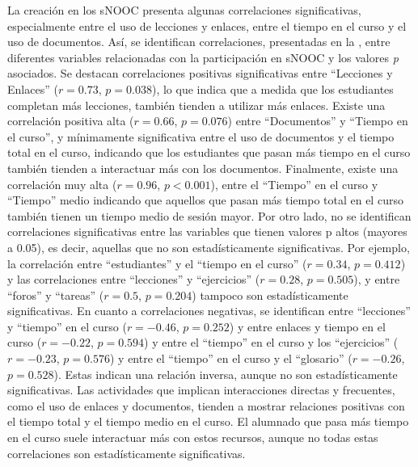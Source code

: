La creación en los sNOOC presenta algunas correlaciones significativas,
especialmente entre el uso de lecciones y enlaces, entre el tiempo en el
curso y el uso de documentos. Así, se identifican correlaciones,
presentadas en la , entre diferentes variables relacionadas con
la participación en sNOOC y los valores \emph{p} asociados. Se destacan
correlaciones positivas significativas entre ``Lecciones y Enlaces'' ($r
= 0.73$, $p = 0.038$), lo que indica que a medida que los estudiantes
completan más lecciones, también tienden a utilizar más enlaces. Existe
una correlación positiva alta ($r = 0.66$, $p = 0.076$) entre ``Documentos''
y ``Tiempo en el curso'', y mínimamente significativa entre el uso de
documentos y el tiempo total en el curso, indicando que los estudiantes
que pasan más tiempo en el curso también tienden a interactuar más con
los documentos. Finalmente, existe una correlación muy alta ($r = 0.96$, $p
< 0.001$), entre el ``Tiempo'' en el curso y ``Tiempo'' medio
indicando que aquellos que pasan más tiempo total en el curso también
tienen un tiempo medio de sesión mayor. Por otro lado, no se identifican
correlaciones significativas entre las variables que tienen valores p
altos (mayores a 0.05), es decir, aquellas que no son estadísticamente
significativas. Por ejemplo, la correlación entre ``estudiantes'' y el
``tiempo en el curso'' ($r = 0.34$, $p = 0.412$) y las correlaciones entre
``lecciones'' y ``ejercicios'' ($r = 0.28$, $p = 0.505$), y entre ``foros''
y ``tareas'' ($r = 0.5$, $p = 0.204$) tampoco son estadísticamente
significativas. En cuanto a correlaciones negativas, se identifican
entre ``lecciones'' y ``tiempo'' en el curso ($r = -0.46$, $p = 0.252$) y
entre enlaces y tiempo en el curso ($r = -0.22$, $p = 0.594$) y entre el
``tiempo'' en el curso y los ``ejercicios'' ($r = -0.23$, $p = 0.576$) y
entre el ``tiempo'' en el curso y el ``glosario'' ($r = -0.26$, $p =
0.528$). Estas indican una relación inversa, aunque no son
estadísticamente significativas. Las actividades que implican
interacciones directas y frecuentes, como el uso de enlaces y
documentos, tienden a mostrar relaciones positivas con el tiempo total y
el tiempo medio en el curso. El alumnado que pasa más tiempo en el curso
suele interactuar más con estos recursos, aunque no todas estas
correlaciones son estadísticamente significativas.
	
